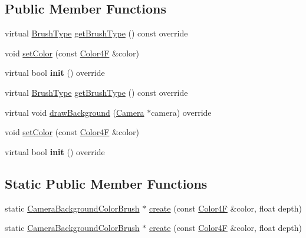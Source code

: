 \subsection*{Public Member Functions}
\begin{DoxyCompactItemize}
\item 
virtual \hyperlink{classCameraBackgroundBrush_acb83e8d05e7ab9386c041d22c444760f}{Brush\+Type} \hyperlink{classCameraBackgroundColorBrush_a96ecf77baa742b668db0d22c350b8f1b}{get\+Brush\+Type} () const override
\item 
void \hyperlink{classCameraBackgroundColorBrush_a893195becfc210703450698a8537e5bc}{set\+Color} (const \hyperlink{structColor4F}{Color4F} \&color)
\item 
\mbox{\label{classCameraBackgroundColorBrush_a1f8fe65aa52e54842620a7d7aa0ee1ef}} 
virtual bool {\bfseries init} () override
\item 
virtual \hyperlink{classCameraBackgroundBrush_acb83e8d05e7ab9386c041d22c444760f}{Brush\+Type} \hyperlink{classCameraBackgroundColorBrush_a96ecf77baa742b668db0d22c350b8f1b}{get\+Brush\+Type} () const override
\item 
virtual void \hyperlink{classCameraBackgroundColorBrush_aa07e5c7ea9d5c233c51920bf75d1381b}{draw\+Background} (\hyperlink{classCamera}{Camera} $\ast$camera) override
\item 
void \hyperlink{classCameraBackgroundColorBrush_a893195becfc210703450698a8537e5bc}{set\+Color} (const \hyperlink{structColor4F}{Color4F} \&color)
\item 
\mbox{\label{classCameraBackgroundColorBrush_a45033cabd558da8ad54e91906305da0f}} 
virtual bool {\bfseries init} () override
\end{DoxyCompactItemize}
\subsection*{Static Public Member Functions}
\begin{DoxyCompactItemize}
\item 
static \hyperlink{classCameraBackgroundColorBrush}{Camera\+Background\+Color\+Brush} $\ast$ \hyperlink{classCameraBackgroundColorBrush_ad4b910ac4cab440aebc91c800f8b60d6}{create} (const \hyperlink{structColor4F}{Color4F} \&color, float depth)
\item 
static \hyperlink{classCameraBackgroundColorBrush}{Camera\+Background\+Color\+Brush} $\ast$ \hyperlink{classCameraBackgroundColorBrush_a2842107f9ebac9204075d259b66176f0}{create} (const \hyperlink{structColor4F}{Color4F} \&color, float depth)
\end{DoxyCompactItemize}
